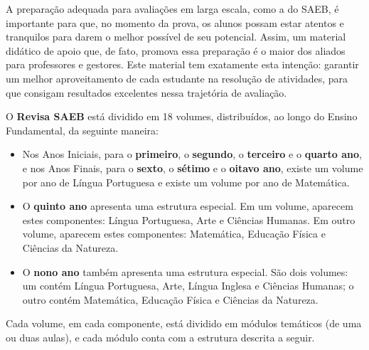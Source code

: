 A preparação adequada para avaliações em larga escala, como a do SAEB, é
importante para que, no momento da prova, os alunos possam estar atentos
e tranquilos para darem o melhor possível de seu potencial. Assim, um
material didático de apoio que, de fato, promova essa preparação é o
maior dos aliados para professores e gestores. Este material tem
exatamente esta intenção: garantir um melhor aproveitamento de cada
estudante na resolução de atividades, para que consigam resultados
excelentes nessa trajetória de avaliação.

O \textbf{Revisa SAEB} está dividido em 18 volumes, distribuídos, ao
longo do Ensino Fundamental, da seguinte maneira:

\begin{itemize}
\item
  Nos Anos Iniciais, para o \textbf{primeiro}, o \textbf{segundo}, o
  \textbf{terceiro} e o \textbf{quarto ano}, e nos Anos Finais, para o
  \textbf{sexto}, o \textbf{sétimo} e o \textbf{oitavo ano}, existe um
  volume por ano de Língua Portuguesa e existe um volume por ano de
  Matemática.
\item
  O \textbf{quinto ano} apresenta uma estrutura especial. Em um volume,
  aparecem estes componentes: Língua Portuguesa, Arte e Ciências
  Humanas. Em outro volume, aparecem estes componentes: Matemática,
  Educação Física e Ciências da Natureza.
\item
  O \textbf{nono ano} também apresenta uma estrutura especial. São dois
  volumes: um contém Língua Portuguesa, Arte, Língua Inglesa e Ciências
  Humanas; o outro contém Matemática, Educação Física e Ciências da
  Natureza.
\end{itemize}

Cada volume, em cada componente, está dividido em módulos temáticos (de
uma ou duas aulas), e cada módulo conta com a estrutura descrita a
seguir.

